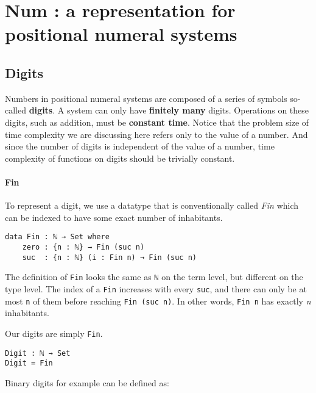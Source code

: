 \documentclass[12pt, a4paper]{article}
\begin{document}
\section{Num : a representation for positional numeral systems}\label{representation}


\subsection{Digits}

Numbers in positional numeral systems are composed of a series of symbols
so-called \textbf{digits}. A system can only have \textbf{finitely many} digits.
Operations on these digits, such as addition, must be \textbf{constant time}.
Notice that the problem size of time complexity we are discussing here refers
only to the value of a number. And since the number of digits is independent of
the value of a number, time complexity of functions on digits should be trivially
constant.

\paragraph{Fin}
To represent a digit, we use a datatype that is conventionally called \textit{Fin}
which can be indexed to have some exact number of inhabitants.

\begin{lstlisting}
data Fin : ℕ → Set where
    zero : {n : ℕ} → Fin (suc n)
    suc  : {n : ℕ} (i : Fin n) → Fin (suc n)
\end{lstlisting}

The definition of {\lstinline|Fin|} looks the same as {\lstinline|ℕ|} on the term
level, but different on the type level. The index of a {\lstinline|Fin|} increases
with every {\lstinline|suc|}, and there can only be at most {\lstinline|n|} of
them before reaching {\lstinline|Fin (suc n)|}. In other words, {\lstinline|Fin n|}
has exactly \textit{n} inhabitants.

Our digits are simply {\lstinline|Fin|}.

\begin{lstlisting}
Digit : ℕ → Set
Digit = Fin
\end{lstlisting}

Binary digits for example can be defined as:
\end{document}
